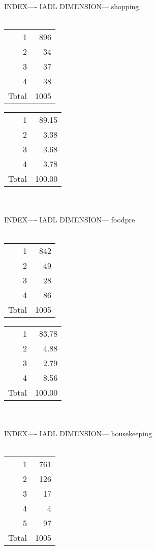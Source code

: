 \documentclass[11pt]{article}
\begin{document}
INDEX---- IADL DIMENSION--- shopping 
 \\\\ 
% 
\begin{tabular}{rr}
   \hline
1 & 896 \\ 
  2 &  34 \\ 
  3 &  37 \\ 
  4 &  38 \\ 
  Total & 1005 \\ 
   \hline
\end{tabular}
% 
\begin{tabular}{rr}
   \hline
1 & 89.15 \\ 
  2 & 3.38 \\ 
  3 & 3.68 \\ 
  4 & 3.78 \\ 
  Total & 100.00 \\ 
   \hline
\end{tabular}
\\\\ 
INDEX---- IADL DIMENSION--- foodpre 
 \\\\ 
% 
\begin{tabular}{rr}
   \hline
1 & 842 \\ 
  2 &  49 \\ 
  3 &  28 \\ 
  4 &  86 \\ 
  Total & 1005 \\ 
   \hline
\end{tabular}
% 
\begin{tabular}{rr}
   \hline
1 & 83.78 \\ 
  2 & 4.88 \\ 
  3 & 2.79 \\ 
  4 & 8.56 \\ 
  Total & 100.00 \\ 
   \hline
\end{tabular}
\\\\ 
INDEX---- IADL DIMENSION--- housekeeping 
 \\\\ 
% 
\begin{tabular}{rr}
   \hline
1 & 761 \\ 
  2 & 126 \\ 
  3 &  17 \\ 
  4 &   4 \\ 
  5 &  97 \\ 
  Total & 1005 \\ 
   \hline
\end{tabular}
\end{document}
